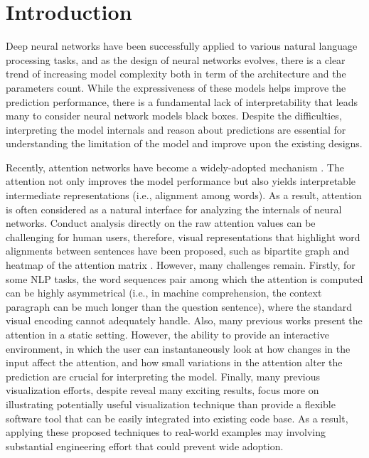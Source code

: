 \section{Introduction}

Deep neural networks have been successfully applied to various natural language processing tasks,
and as the design of neural networks evolves, there is a clear trend of increasing model complexity both in term of the architecture and the parameters count. 
%
While the expressiveness of these models helps improve the prediction performance, there is a fundamental lack of interpretability that leads many to consider neural network models black boxes. 
%
Despite the difficulties, interpreting the model internals and reason about predictions are essential for understanding the limitation of the model and improve upon the existing designs.


Recently, attention networks have become a widely-adopted mechanism \cite{bahdanau2014neural,seo2016bidirectional,Parikh2016, VaswaniShazeerParmar2017}. The attention not only improves the model performance but also yields interpretable intermediate representations (i.e., alignment among words). As a result, attention is often considered as a natural interface for analyzing the internals of neural networks. Conduct analysis directly on the raw attention values can be challenging for human users, therefore, visual representations that highlight word alignments between sentences have been proposed, such as bipartite graph and heatmap of the attention matrix \cite{LiChenHovy2015, li2016understanding, lee2017interactive}.  However, many challenges remain. Firstly, for some NLP tasks, the word sequences pair among which the attention is computed can be highly asymmetrical (i.e., in machine comprehension, the context paragraph can be much longer than the question sentence), where the standard visual encoding cannot adequately handle.  Also, many previous works present the attention in a static setting. However, the ability to provide an interactive environment, in which the user can instantaneously look at how changes in the input affect the attention, and how small variations in the attention alter the prediction are crucial for interpreting the model. Finally, many previous visualization efforts, despite reveal many exciting results, focus more on illustrating potentially useful visualization technique than provide a flexible software tool that can be easily integrated into existing code base. As a result, applying these proposed techniques to real-world examples may involving substantial engineering effort that could prevent wide adoption.

